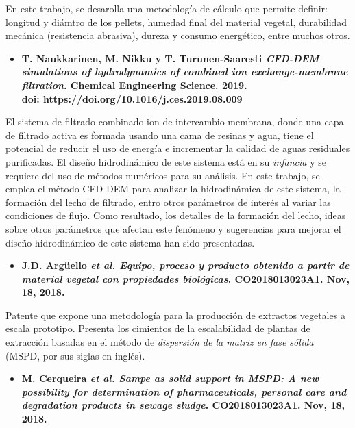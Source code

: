 \noindent
\justify

En este trabajo, se desarolla una metodolog\'ia de c\'alculo que permite definir: longitud y di\'amtro de los pellets, humedad final del material vegetal, durabilidad mec\'anica (resistencia abrasiva), dureza y consumo energ\'etico, entre muchos otros.

\begin{itemize}
	\item \textbf{T. Naukkarinen, M. Nikku y T. Turunen-Saaresti \textit{CFD-DEM simulations of hydrodynamics of combined ion exchange-membrane filtration}. Chemical Engineering Science. 2019. \\ doi: https://doi.org/10.1016/j.ces.2019.08.009}
\end{itemize}

\noindent
\justify

El sistema de filtrado combinado ion de intercambio-membrana, donde una capa de filtrado activa es formada usando una cama de resinas y agua, tiene el potencial de reducir el uso de energ\'ia e incrementar la calidad de aguas residuales purificadas. El dise\~no hidrodin\'amico de este sistema est\'a en su \textit{infancia} y se requiere del uso de m\'etodos num\'ericos para su an\'alisis. En este trabajo, se emplea el m\'etodo CFD-DEM para analizar la hidrodin\'amica de este sistema, la formaci\'on del lecho de filtrado, entro otros par\'ametros de inter\'es al variar las condiciones de flujo. Como resultado, los detalles de la formaci\'on del lecho, ideas sobre otros par\'ametros que afectan este fen\'omeno y sugerencias para mejorar el dise\~no hidrodin\'amico de este sistema han sido presentadas.

\begin{itemize}
	\item \textbf{J.D. Arg\"uello \textit{et al. Equipo, proceso y producto obtenido a partir de material vegetal con propiedades biol\'ogicas}. CO2018013023A1. Nov, 18, 2018.}
\end{itemize}

\noindent
\justify

Patente que expone una metodolog\'ia para la producci\'on de extractos vegetales a escala prototipo. Presenta los cimientos de la escalabilidad de plantas de extracci\'on basadas en el m\'etodo de \textit{dispersi\'on de la matriz en fase s\'olida} (MSPD, por sus siglas en ingl\'es).

\begin{itemize}
	\item \textbf{M. Cerqueira \textit{et al. Sampe as solid support in MSPD: A new possibility for determination of pharmaceuticals, personal care and degradation products in sewage sludge}. CO2018013023A1. Nov, 18, 2018.}
\end{itemize}

